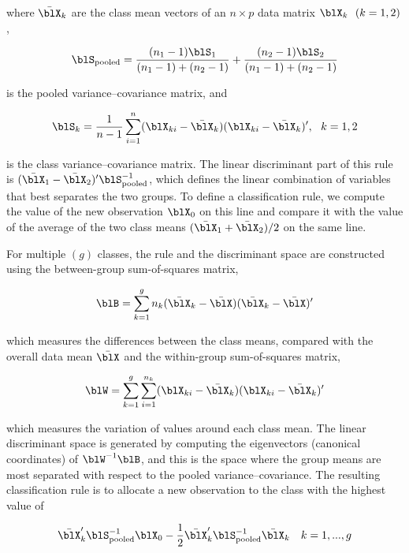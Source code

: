 \noindent where $\bar{\blX}_k $ are the class mean vectors of an 
$n\times p$ data matrix $\blX_k ~~(k=1,2)$, 

\[
\blS_{\rm pooled} = \frac{(n_1-1)
\blS_1}{(n_1-1)+(n_2-1)} + \frac{(n_2-1) \blS_2}{(n_1-1)+(n_2-1)}
\]

\noindent is the pooled variance--covariance matrix, and

\[ 
\blS_k = \frac{1}{n-1}\sum_{i=1}^{n}
(\blX_{ki}-\bar{\blX}_k)(\blX_{ki}-\bar{\blX}_k)', ~~k=1,2
\]

\noindent is the class variance--covariance matrix. The linear
discriminant part of this rule is
$(\bar{\blX}_1-\bar{\blX}_2)'\blS^{-1}_{\rm pooled}$, which defines
the linear combination of variables that best separates the two
groups.  To define a classification rule, we compute the value of the
new observation $\blX_0$ on this line and compare it with the value of
the average of the two class means $(\bar{\blX}_1+\bar{\blX}_2)/2$ on
the same line.

For multiple $(g)$ classes, the rule and the discriminant space are
constructed using the between-group sum-of-squares matrix,

\[
\blB =
\sum_{k=1}^g n_k(\bar{\blX}_k-\bar{\blX})(\bar{\blX}_k-\bar{\blX})' 
\]

\noindent which measures the differences between the class means, 
compared with the overall data mean $\bar{\blX}$ and the within-group
sum-of-squares matrix,

\[
\blW =
\sum_{k=1}^g\sum_{i=1}^{n_k}
(\blX_{ki}-\bar{\blX}_k)(\blX_{ki}-\bar{\blX}_k)'
\]

\noindent which measures the variation of values around each class mean.
The linear discriminant space is generated by computing the
eigenvectors (canonical coordinates) of $\blW^{-1}\blB$, and this is
the space where the group means are most separated with respect to the
pooled variance--covariance. The resulting classification rule is to
allocate a new observation to the class with the highest value of

\begin{eqnarray}
\bar{\blX}_k'\blS^{-1}_{\rm pooled}\blX_0 - 
\frac{1}{2}\bar{\blX}_k'\blS^{-1}_{\rm pooled}\bar{\blX}_k ~~~k=1,...,g \label{lda-rule}
\end{eqnarray}


